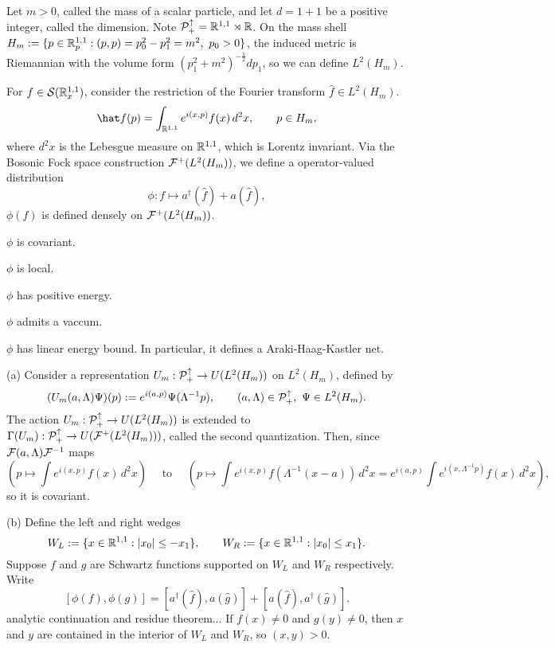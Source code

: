 \documentclass{../../large}
\begin{document}
\begin{prb}
Let $m>0$, called the mass of a scalar particle, and let $d=1+1$ be a positive integer, called the dimension.
Note $\mathcal{P}_+^\uparrow=\mathbb{R}^{1,1}\rtimes\mathbb{R}$.
On the mass shell $H_m:=\{p\in\R^{1,1}_p:(p,p)=p_0^2-p_1^2=m^2,\ p_0>0\}$, the induced metric is Riemannian with the volume form $(p_1^2+m^2)^{-\frac12}dp_1$, so we can define $L^2(H_m)$.

For $f\in\mathcal{S}(\mathbb{R}^{1,1}_x)$, consider the restriction of the Fourier transform $\hat f\in L^2(H_m)$.
\[\hat f(p)=\int_{\R^{1,1}}e^{i(x,p)}f(x)\,d^2x,\qquad p\in H_m,\]
where $d^2x$ is the Lebesgue measure on $\mathbb{R}^{1,1}$, which is Lorentz invariant.
Via the Bosonic Fock space construction $\mathcal{F}^+(L^2(H_m))$, we define a operator-valued distribution
\[\phi:f\mapsto a^\dagger(\hat f)+a(\hat f),\]
$\phi(f)$ is defined densely on $\mathcal{F}^+(L^2(H_m))$.


\begin{parts}
\item $\phi$ is covariant.
\item $\phi$ is local.
\item $\phi$ has positive energy.
\item $\phi$ admits a vaccum.
\item $\phi$ has linear energy bound. In particular, it defines a Araki-Haag-Kastler net.
\end{parts}
\end{prb}
\begin{pf}
(a)
Consider a representation $U_m:\mathcal{P}_+^\uparrow\to U(L^2(H_m))$ on $L^2(H_m)$, defined by
\[(U_m(a,\Lambda)\Psi)(p):=e^{i(a,p)}\Psi(\Lambda^{-1}p),\qquad(a,\Lambda)\in\cP_+^\uparrow,\ \Psi\in L^2(H_m).\]
The action $U_m:\mathcal{P}_+^\uparrow\to U(L^2(H_m))$ is extended to $\Gamma(U_m):\mathcal{P}_+^\uparrow\to U(\mathcal{F}^+(L^2(H_m)))$, called the second quantization.
Then, since $\mathcal{F}(a,\Lambda)\mathcal{F}^{-1}$ maps
\[(p\mapsto\int e^{i(x,p)}f(x)\,d^2x)\quad\text{ to }\quad(p\mapsto\int e^{i(x,p)}f(\Lambda^{-1}(x-a))\,d^2x=e^{i(a,p)}\int e^{i(x,\Lambda^{-1}p)}f(x)\,d^2x),\]
so it is covariant.

(b)
Define the left and right wedges
\[W_L:=\{x\in\mathbb{R}^{1,1}:|x_0|\le-x_1\},\qquad W_R:=\{x\in\mathbb{R}^{1,1}:|x_0|\le x_1\}.\]
Suppose $f$ and $g$ are Schwartz functions supported on $W_L$ and $W_R$ respectively.
Write
\[[\phi(f),\phi(g)]=[a^\dagger(\hat f),a(\hat g)]+[a(\hat f),a^\dagger(\hat g)].\]
analytic continuation and residue theorem...
If $f(x)\ne0$ and $g(y)\ne0$, then $x$ and $y$ are contained in the interior of $W_L$ and $W_R$, so $(x,y)>0$.

\end{pf}
\end{document}
